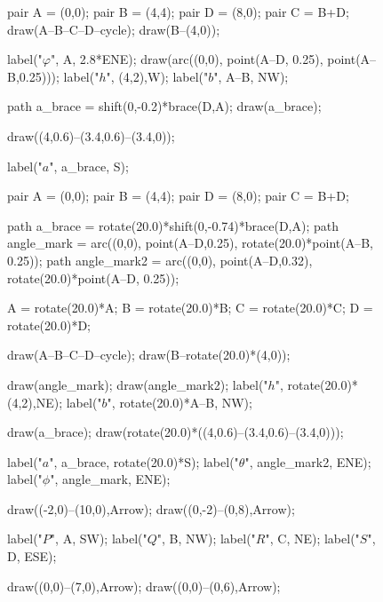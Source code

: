 \documentclass[../textbook.tex]{subfiles}
\begin{document}
\begin{figure}[h]
	\begin{center}
		\begin{minipage}[b]{0.3\textwidth}
			\centering
			\begin{asy}[width=\textwidth]
				pair A = (0,0);
				pair B = (4,4);
				pair D = (8,0);
				pair C = B+D;
				draw(A--B--C--D--cycle);
				draw(B--(4,0));

				label("$\varphi$", A, 2.8*ENE);
				draw(arc((0,0), point(A--D, 0.25), point(A--B,0.25)));
				label("$h$", (4,2),W);
				label("$b$", A--B, NW);

				path a_brace = shift(0,-0.2)*brace(D,A);
				draw(a_brace);

				draw((4,0.6)--(3.4,0.6)--(3.4,0));

				label("$a$", a_brace, S);
			\end{asy}
		\end{minipage}
		\hfill
		\begin{minipage}[b]{0.3\textwidth}
			\centering
			\begin{asy}[width=\textwidth]
				pair A = (0,0);
				pair B = (4,4);
				pair D = (8,0);
				pair C = B+D;

				path a_brace = rotate(20.0)*shift(0,-0.74)*brace(D,A);
				path angle_mark = arc((0,0), point(A--D,0.25), rotate(20.0)*point(A--B, 0.25));
				path angle_mark2 = arc((0,0), point(A--D,0.32), rotate(20.0)*point(A--D, 0.25));

				A = rotate(20.0)*A;
				B = rotate(20.0)*B;
				C = rotate(20.0)*C;
				D = rotate(20.0)*D;

				draw(A--B--C--D--cycle);
				draw(B--rotate(20.0)*(4,0));

				draw(angle_mark);
				draw(angle_mark2);
				label("$h$", rotate(20.0)*(4,2),NE);
				label("$b$", rotate(20.0)*A--B, NW);

				draw(a_brace);
				draw(rotate(20.0)*((4,0.6)--(3.4,0.6)--(3.4,0)));

				label("$a$", a_brace, rotate(20.0)*S);
				label("$\theta$", angle_mark2, ENE);
				label("$\phi$", angle_mark, ENE);

				draw((-2,0)--(10,0),Arrow);
				draw((0,-2)--(0,8),Arrow);

				label("$P$", A, SW);
				label("$Q$", B, NW);
				label("$R$", C, NE);
				label("$S$", D, ESE);
			\end{asy}
		\end{minipage}
		\hfill
		\begin{minipage}[b]{0.3\textwidth}
			\centering
			\begin{asy}[width=\textwidth]
				draw((0,0)--(7,0),Arrow);
				draw((0,0)--(0,6),Arrow);


\end{asy}
\end{minipage}
\end{center}
\end{figure}
\end{document}
